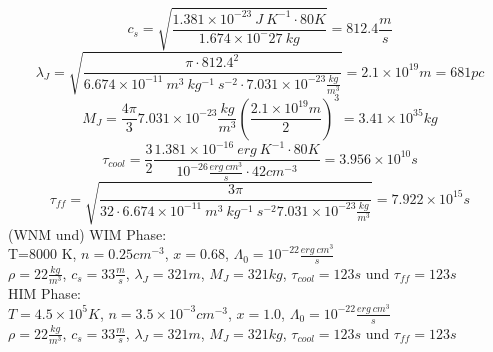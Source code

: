 \begin{equation}
c_{s}=\sqrt{\frac{ 1.381 \times 10^{-23}~J~K^{-1}\cdot 80 K}{1.674 \times 10^-27~kg}} = 812.4 \frac{m}{s}
\end{equation}
\begin{equation}
\lambda_{J}=\sqrt{\frac{\pi \cdot 812.4^2}{6.674 \times 10^{-11}~m^3~kg^{-1}~s^{-2} \cdot 7.031 \times 10^{-23} \frac{kg}{m^3}}} = 2.1 \times 10^{19} m = 681 pc
\end{equation}
\begin{equation}
M_{J}=\frac{4 \pi}{3} 7.031 \times 10^{-23} \frac{kg}{m^3} \left ( \frac{2.1 \times 10^{19} m}{2} \right)^3 = 3.41 \times 10^{35} kg
\end{equation}
\begin{equation}
\tau_{cool}=\frac{3}{2} \frac{1.381 \times 10^{-16}~erg~K^{-1} \cdot 80 K}{10^{-26} \frac{erg~cm^3}{s} \cdot 42 cm^{-3}} = 3.956 \times 10^{10} s
\end{equation}
\begin{equation}
\tau_{ff}= \sqrt{\frac{3 \pi}{32 \cdot 6.674 \times 10^{-11}~m^3~kg^{-1}~s^{-2} 7.031 \times 10^{-23} \frac{kg}{m^3}}} = 7.922 \times 10^{15} s
\end{equation}
(WNM und) WIM Phase: \\
T=8000 K, $n = 0.25 cm^{-3}$, $x=0.68$, $\Lambda_0 = 10^{-22} \frac{erg~cm^3}{s}$\\
$\rho= 22 \frac{kg}{m^3}$, $c_{s}=33 \frac{m}{s}$, $\lambda_{J}= 321 m$, $M_{J}= 321 kg$, $\tau_{cool} = 123 s$ und $\tau_{ff} = 123 s$\\
HIM Phase: \\
$T=4.5 \times 10^{5} K$, $n = 3.5 \times 10^{-3} cm^{-3}$, $x=1.0$, $\Lambda_0 = 10^{-22} \frac{erg~cm^3}{s}$\\
$\rho= 22 \frac{kg}{m^3}$, $c_{s}=33 \frac{m}{s}$, $\lambda_{J}= 321 m$, $M_{J}= 321 kg$, $\tau_{cool} = 123 s$ und $\tau_{ff} = 123 s$\\
